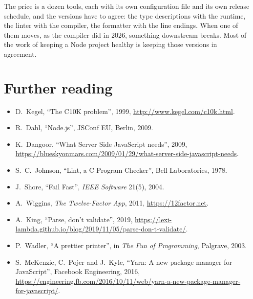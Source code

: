 The price is a dozen tools, each with its own configuration file and its own
release schedule, and the versions have to agree: the type descriptions with
the runtime, the linter with the compiler, the formatter with the line endings.
When one of them moves, as the compiler did in 2026, something downstream
breaks. Most of the work of keeping a Node project healthy is keeping those
versions in agreement.

\section*{Further reading}

\begin{itemize}
  \item D.\ Kegel, ``The C10K problem'', 1999,
        \url{http://www.kegel.com/c10k.html}.
  \item R.\ Dahl, ``Node.js'', JSConf EU, Berlin, 2009.
  \item K.\ Dangoor, ``What Server Side JavaScript needs'', 2009,
        \url{https://blueskyonmars.com/2009/01/29/what-server-side-javascript-needs}.
  \item S.~C.\ Johnson, ``Lint, a C Program Checker'', Bell Laboratories, 1978.
  \item J.\ Shore, ``Fail Fast'', \emph{IEEE Software} 21(5), 2004.
  \item A.\ Wiggins, \emph{The Twelve-Factor App}, 2011,
        \url{https://12factor.net}.
  \item A.\ King, ``Parse, don't validate'', 2019,
        \url{https://lexi-lambda.github.io/blog/2019/11/05/parse-don-t-validate/}.
  \item P.\ Wadler, ``A prettier printer'', in \emph{The Fun of Programming},
        Palgrave, 2003.
  \item S.\ McKenzie, C.\ Pojer and J.\ Kyle, ``Yarn: A new package manager for
        JavaScript'', Facebook Engineering, 2016,
        \url{https://engineering.fb.com/2016/10/11/web/yarn-a-new-package-manager-for-javascript/}.
\end{itemize}
